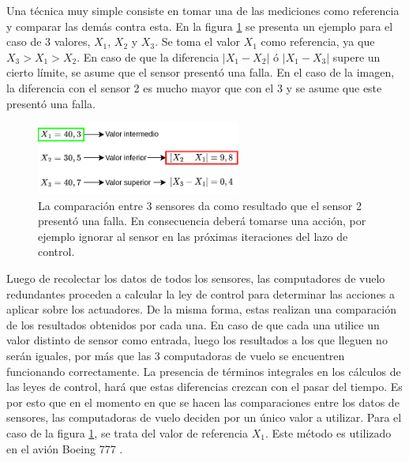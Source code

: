 
Una técnica muy simple consiste en tomar una de las mediciones como referencia y comparar las demás contra esta. En la figura \ref{fig:votacion_sensores} se presenta un ejemplo para el caso de 3 valores, $X_1$, $X_2$ y $X_3$. Se toma el valor $X_1$ como referencia, ya que $X_3 > X_1 > X_2$. En caso de que la diferencia $| X_1 - X_2 |$ ó $| X_1 - X_3 |$ supere un cierto límite, se asume que el sensor presentó una falla. En el caso de la imagen, la diferencia con el sensor 2 es mucho mayor que con el 3 y se asume que este presentó una falla.

\begin{figure}[H]
    \centering
    \includegraphics[width=0.6\textwidth]{img/votacion_sensores.png}
    \caption{La comparación entre 3 sensores da como resultado que el sensor 2 presentó una falla. En consecuencia deberá tomarse una acción, por ejemplo ignorar al sensor en las próximas iteraciones del lazo de control.}
    \label{fig:votacion_sensores}
\end{figure}

Luego de recolectar los datos de todos los sensores, las computadores de vuelo redundantes proceden a calcular la ley de control para determinar las acciones a aplicar sobre los actuadores. De la misma forma, estas realizan una comparación de los resultados obtenidos por cada una. En caso de que cada una utilice un valor distinto de sensor como entrada, luego los resultados a los que lleguen no serán iguales, por más que las 3 computadoras de vuelo se encuentren funcionando correctamente. La presencia de términos integrales en los cálculos de las leyes de control, hará que estas diferencias crezcan con el pasar del tiempo. Es por esto que en el momento en que se hacen las comparaciones entre los datos de sensores, las computadoras de vuelo deciden por un único valor a utilizar. Para el caso de la figura \ref{fig:votacion_sensores}, se trata del valor de referencia $X_1$. Este método es utilizado en el avión Boeing 777 \cite{yeh1996triple}. 

